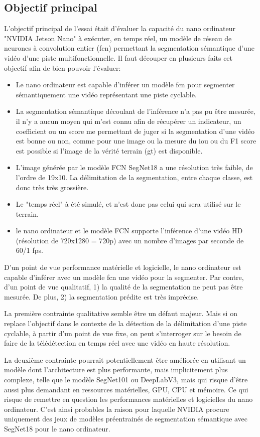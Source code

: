﻿\subsection{Objectif principal}
\par L'objectif principal de l'essai était d'évaluer la capacité du nano ordinateur "NVIDIA Jetson Nano" à exécuter, en temps réel, un modèle de réseau de neurones à convolution entier (\acrshort{fcn}) permettant la segmentation sémantique d'une vidéo d'une piste multifonctionnelle. Il faut découper en plusieurs faits cet objectif afin de bien pouvoir l'évaluer: 
\begin{itemize}
   \item Le nano ordinateur est capable d'inférer un modèle \acrshort{fcn} pour segmenter sémantiquement une vidéo représentant une piste cyclable. 
   \item La segmentation sémantique découlant de l'inférence n'a pas pu être mesurée, il n'y a aucun moyen qui m'est connu afin de récupérer un indicateur, un coefficient ou un score me permettant de juger si la segmentation d'une vidéo est bonne ou non, comme pour une image ou la mesure du \acrshort{iou} ou du F1 score est possible si l'image de la vérité terrain (\acrshort{gt}) est disponible. 
   \item L'image générée par le modèle FCN SegNet18 a une résolution très faible, de l'ordre de 19x10. La délimitation de la segmentation, entre chaque classe, est donc très très grossière.
   \item Le "temps réel" à été simulé, et n'est donc pas celui qui sera utilisé sur le terrain. 
   \item le nano ordinateur et le modèle FCN supporte l'inférence d'une vidéo HD (résolution de 720x1280 = 720p) avec un nombre d'images par seconde de 60/1 \acrshort{fps}.
\end{itemize}   
\par D'un point de vue performance matérielle et logicielle, le nano ordinateur est capable d'inférer avec un modèle \acrshort{fcn} une vidéo pour la segmenter. Par contre, d'un point de vue qualitatif, 1) la qualité de la segmentation ne peut pas être mesurée. De plus, 2) la segmentation prédite est très imprécise.
\par La première contrainte qualitative semble être un défaut majeur. Mais si on replace l'objectif dans le contexte de la détection de la délimitation d'une piste cyclable, à partir d'un point de vue fixe, on peut s'interroger sur le besoin de faire de la télédétection en temps réel avec une vidéo en haute résolution.
\par La deuxième  contrainte pourrait potentiellement être améliorée en utilisant un modèle dont l'architecture est plus performante, mais implicitement plus complexe, telle que le modèle SegNet101 ou DeepLabV3, mais qui risque d'être aussi plus demandant en ressources matérielles, GPU, CPU et mémoire. Ce qui risque de remettre en question les performances matérielles et logicielles du nano ordinateur. C'est ainsi probables la raison pour laquelle NVIDIA procure uniquement des jeux de modèles préentrainés de segmentation sémantique avec SegNet18 pour le nano ordinateur. 
